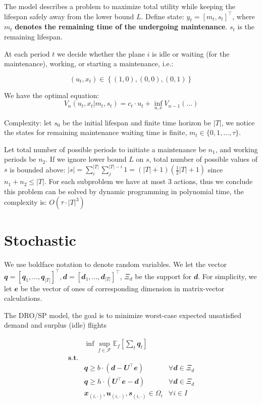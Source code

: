 \documentclass[
  a4paper,
,tablecaptionabove
]{scrartcl}
\numberwithin{equation}{section}
\begin{document}
The model describes a problem to maximize total utility while keeping
the lifespan safely away from the lower bound \(L\). Define state:
\(y_t = \left[m_t,s_t \right]^\top\), where \(m_t\) \textbf{denotes the
  remaining time of the undergoing maintenance}. \(s_t\) is the remaining
lifespan.

At each period \(t\) we decide whether the plane \(i\) is idle or
waiting (for the maintenance), working, or starting a maintenance, i.e.:

\[(u_t, x_t) \in \left\{(1, 0), (0,0), (0, 1)\right\}\]

We have the optimal equation:
\[V_n(u_t, x_t | m_t, s_t) = c_t \cdot u_t + \inf_{u,x} V_{n-1}(...)\]

Complexity: let \(s_0\) be the initial lifespan and finite time horizon
be \(|T|\), we notice the states for remaining maintenance waiting time
is finite, \(m_t \in \{0, 1, ..., \tau\}\).

Let total number of possible periods to initiate a maintenance be
\(n_1\), and working periods be \(n_2\). If we ignore lower bound \(L\)
on \(s\), total number of possible values of \(s\) is bounded above:
\(|s| = \sum_i^{|T|}\sum_j^{|T| - i} 1=(|T| + 1)(\frac{1}{2}|T| + 1)\)
since \(n_1 + n_2 \le |T|\). For each subproblem we have at most 3
actions, thus we conclude this problem can be solved by dynamic
programming in polynomial time, the complexity is:
\(O\left(\tau\cdot|T|^3 \right)\)

\hypertarget{stochastic}{%
  \section{Stochastic}\label{stochastic}}

We use boldface notation to denote random variables. We let the vector
\(\mathbfit q = [\mathbfit q_1, ..., \mathbfit q_{|T|}]^\top, \mathbfit d = [\mathbfit d_1,...,\mathbfit d_{|T|}]^\top\),
\(\Xi_d\) be the support for \(\mathbfit{d}\). For simplicity, we let
\(\mathbfit e\) be the vector of ones of corresponding dimension in
matrix-vector calculations.

The DRO/SP model, the goal is to minimize worst-case expected
unsatisfied demand and surplus (idle) flights

\[\begin{aligned}
                  & \inf \sup_{f\in \mathscr F}\mathbb E_f \left[ \sum_t \mathbfit q_t  \right]                                            \\
    \mathbf{s.t.} &                                                                                                                        \\
                  & \mathbfit q \ge b\cdot \left (\mathbfit d - \mathbfit U^\top \mathbfit{e} \right)      & \forall \mathbfit d \in \Xi_d \\
                  & \mathbfit q \ge h\cdot \left ( \mathbfit U^\top \mathbfit{e}  - \mathbfit d \right )   & \forall \mathbfit d \in \Xi_d \\
                  & \mathbfit x_{(i,\cdot)}, \mathbfit u_{(i,\cdot)}, \mathbfit s_{(i,\cdot)} \in \Omega_i & \forall i\in I
  \end{aligned}\]
\end{document}

